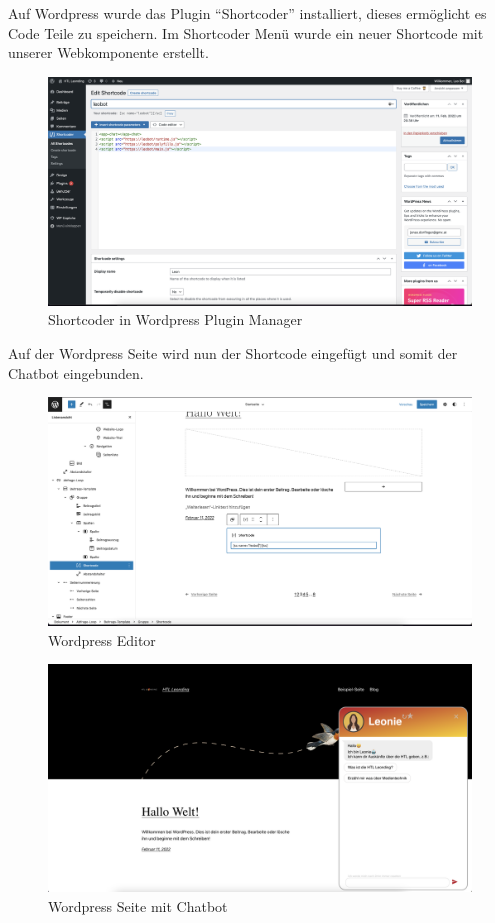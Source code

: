 Auf Wordpress wurde das Plugin ``Shortcoder''\cite{shortcoder} installiert, dieses ermöglicht es Code Teile zu speichern.
Im Shortcoder Menü wurde ein neuer Shortcode mit unserer Webkomponente erstellt.

\begin{figure}[hbt!]
    \centering
    \includegraphics[scale=0.2]{pics/shortcoder}
    \caption{Shortcoder in Wordpress Plugin Manager}
    \label{fig:impl:shortcoder}
\end{figure}

Auf der Wordpress Seite wird nun der Shortcode eingefügt und somit der Chatbot eingebunden.

\begin{figure}[hbt!]
    \centering
    \includegraphics[scale=0.2]{pics/wordpressedit}
    \caption{Wordpress Editor}
    \label{fig:impl:wordpressedit}
\end{figure}

\begin{figure}[hbt!]
    \centering
    \includegraphics[scale=0.2]{pics/wordpresspage}
    \caption{Wordpress Seite mit Chatbot}
    \label{fig:impl:wordpresspage}
\end{figure}

